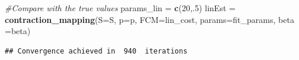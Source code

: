 \documentclass[12pt,a4paper]{article}
\newenvironment{Shaded}{\begin{snugshade}}{\end{snugshade}}
\newcommand{\CommentTok}[1]{\textcolor[rgb]{0.56,0.35,0.01}{\textit{#1}}}
\newcommand{\DataTypeTok}[1]{\textcolor[rgb]{0.13,0.29,0.53}{#1}}
\newcommand{\DecValTok}[1]{\textcolor[rgb]{0.00,0.00,0.81}{#1}}
\newcommand{\KeywordTok}[1]{\textcolor[rgb]{0.13,0.29,0.53}{\textbf{#1}}}
\newcommand{\NormalTok}[1]{#1}
\newcommand{\StringTok}[1]{\textcolor[rgb]{0.31,0.60,0.02}{#1}}
\begin{document}
\begin{Shaded}
\begin{Highlighting}[]
\CommentTok{#Compare with the true values}
\NormalTok{params_lin =}\StringTok{ }\KeywordTok{c}\NormalTok{(}\DecValTok{20}\NormalTok{,.}\DecValTok{5}\NormalTok{)}
\NormalTok{linEst =}\StringTok{ }\KeywordTok{contraction_mapping}\NormalTok{(}\DataTypeTok{S=}\NormalTok{S, }\DataTypeTok{p=}\NormalTok{p, }\DataTypeTok{FCM=}\NormalTok{lin_cost, }\DataTypeTok{params=}\NormalTok{fit_params, }\DataTypeTok{beta =}\NormalTok{beta)}
\end{Highlighting}
\end{Shaded}

\begin{verbatim}
## Convergence achieved in  940  iterations
\end{verbatim}
\end{document}
